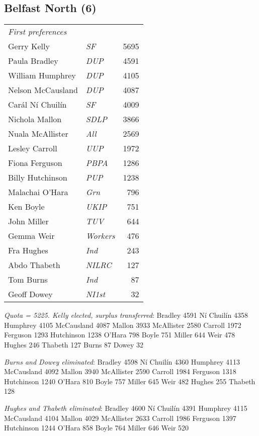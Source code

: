 \begin{resultsiii}
\subsection*{Belfast North (6)}


\noindent
\begin{tabular*}{\columnwidth}{@{\extracolsep{\fill}} p{} >{\itshape}l r @{\extracolsep{\fill}}}
\emph{First preferences}\\
Gerry Kelly & SF & 5695\\
Paula Bradley & DUP & 4591\\
William Humphrey & DUP & 4105\\
Nelson McCausland & DUP & 4087\\
Carál Ní Chuilín & SF & 4009\\
Nichola Mallon & SDLP & 3866\\
Nuala McAllister & All & 2569\\
Lesley Carroll & UUP & 1972\\
Fiona Ferguson & PBPA & 1286\\
Billy Hutchinson & PUP & 1238\\
Malachai O'Hara & Grn & 796\\
Ken Boyle & UKIP & 751\\
John Miller & TUV & 644\\
Gemma Weir & Workers & 476\\
Fra Hughes & Ind & 243\\
Abdo Thabeth & NILRC & 127\\
Tom Burns & Ind & 87\\
Geoff Dowey & NI1st & 32\\
\end{tabular*}

\emph{Quota = 5225.  Kelly elected, surplus transferred}: Bradley 4591 Ní Chuilín 4358 Humphrey 4105 McCausland 4087 Mallon 3933 McAllister 2580 Carroll 1972 Ferguson 1293 Hutchinson 1238 O'Hara 798 Boyle 751 Miller 644 Weir 478 Hughes 246 Thabeth 127 Burns 87 Dowey 32

\emph{Burns and Dowey eliminated}: Bradley 4598 Ní Chuilín 4360 Humphrey 4113 McCausland 4092 Mallon 3940 McAllister 2590 Carroll 1984 Ferguson 1318 Hutchinson 1240 O'Hara 810 Boyle 757 Miller 645 Weir 482 Hughes 255 Thabeth 128

\emph{Hughes and Thabeth eliminated}: Bradley 4600 Ní Chuilín 4391 Humphrey 4115 McCausland 4104 Mallon 4029 McAllister 2633 Carroll 1986 Ferguson 1397 Hutchinson 1244 O'Hara 858 Boyle 764 Miller 646 Weir 520


\end{resultsiii}

